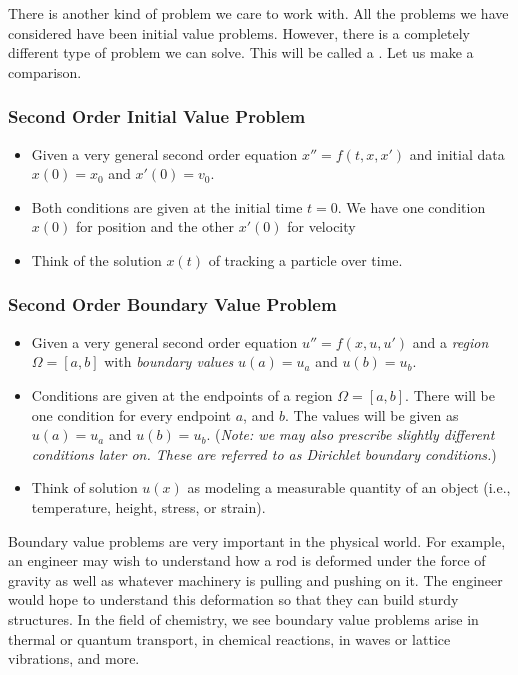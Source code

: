 
There is another kind of problem we care to work with.  All the problems we have considered have been initial value problems. However, there is a completely different type of problem we can solve.  This will be called a .  Let us make a comparison.

\subsubsection{Second Order Initial Value Problem}
\begin{itemize}
    \item Given a very general second order equation $x''=f(t,x,x')$ and initial data $x(0)=x_0$ and $x'(0)=v_0$.
    \item Both conditions are given at the initial time $t=0$. We have one condition $x(0)$ for position and the other $x'(0)$ for velocity
    \item Think of the solution $x(t)$ of tracking a particle over time.
\end{itemize}

\subsubsection{Second Order Boundary Value Problem}
\begin{itemize}
    \item Given a very general second order equation $u''=f(x,u,u')$ and a \emph{region} $\Omega=[a,b]$ with \emph{boundary values} $u(a)=u_a$ and $u(b)=u_b$.
    \item Conditions are given at the endpoints of a region $\Omega=[a,b]$.  There will be one condition for every endpoint $a$, and $b$. The values will be given as $u(a)=u_a$ and $u(b)=u_b$. (\emph{Note: we may also prescribe slightly different conditions later on. These are referred to as Dirichlet boundary conditions.})
    \item Think of solution $u(x)$ as modeling a measurable quantity of an object (i.e., temperature, height, stress, or strain).
\end{itemize}

Boundary value problems are very important in the physical world.  For example, an engineer may wish to understand how a rod is deformed under the force of gravity as well as whatever machinery is pulling and pushing on it.  The engineer would hope to understand this deformation so that they can build sturdy structures.  In the field of chemistry, we see boundary value problems arise in thermal or quantum transport, in chemical reactions, in waves or lattice vibrations, and more.

